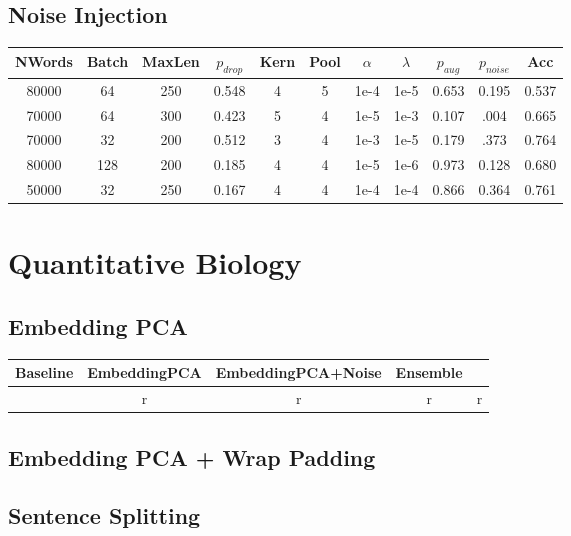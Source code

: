\subsection{Noise Injection}
\begin{center}
 \begin{tabular}{||c c c c c c c c c c c||}
 \hline
 NWords & Batch & MaxLen & $p_{drop}$ & Kern & Pool & $\alpha$ & $\lambda$ & $p_{aug}$ & $p_{noise}$ & Acc\\ [0.5ex]
 \hline\hline
 80000 & 64 & 250 & 0.548 & 4 & 5 & 1e-4 & 1e-5 & 0.653 & 0.195 & 0.537\\
 \hline
 70000 & 64 & 300 & 0.423 & 5 & 4 & 1e-5 & 1e-3 & 0.107 & .004 & 0.665\\
 \hline
 70000 & 32 & 200 & 0.512 & 3 & 4 & 1e-3 & 1e-5 & 0.179 & .373 &  0.764\\
 \hline
 80000 & 128 & 200 & 0.185 & 4 & 4 & 1e-5 & 1e-6 & 0.973 & 0.128 &  0.680\\
 \hline
 50000 & 32 & 250 & 0.167 & 4 & 4 & 1e-4 & 1e-4 & 0.866 & 0.364 & 0.761\\
 [1ex]\hline\end{tabular}\end{center}


\section{Quantitative Biology}
\subsection{Embedding PCA}
\begin{center}
 \begin{tabular}{||c c c c||}
 \hline
 Baseline & EmbeddingPCA & EmbeddingPCA+Noise & Ensemble\\ [0.5ex]
 \hline\hline
 &r&r&r&r\\
 [1ex]\hline\end{tabular}\end{center}

\subsection{Embedding PCA + Wrap Padding}


\subsection{Sentence Splitting}


%
%
